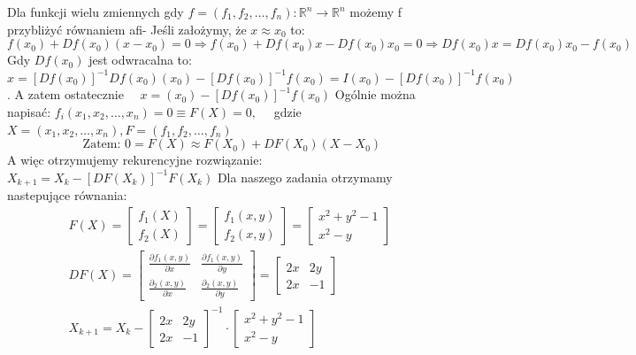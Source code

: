 \documentclass[5]{article}
\begin{document}
Dla funkcji wielu zmiennych gdy $f=\left(f_{1}, f_{2}, \ldots, f_{n}\right): \mathbb{R}^{n} \rightarrow \mathbb{R}^{n}$ możemy f przybliżyć równaniem afi-
Jeśli założymy, że $x \approx x_{0}$ to:
$$
f\left(x_{0}\right)+D f\left(x_{0}\right)\left(x-x_{0}\right)=0 \Rightarrow f\left(x_{0}\right)+D f\left(x_{0}\right) x-D f\left(x_{0}\right) x_{0}=0 \Rightarrow D f\left(x_{0}\right) x=D f\left(x_{0}\right) x_{0}-f\left(x_{0}\right)
$$
Gdy $D f\left(x_{0}\right)$ jest odwracalna to: $x=\left[D f\left(x_{0}\right)\right]^{-1} D f\left(x_{0}\right)\left(x_{0}\right)-\left[D f\left(x_{0}\right)\right]^{-1} f\left(x_{0}\right)=I\left(x_{0}\right)-\left[D f\left(x_{0}\right)\right]^{-1} f\left(x_{0}\right)$.
A zatem ostatecznie $\quad x=\left(x_{0}\right)-\left[D f\left(x_{0}\right)\right]^{-1} f\left(x_{0}\right)$
Ogólnie można napisać: $f_{i}\left(x_{1}, x_{2}, \ldots, x_{n}\right)=0 \equiv F(X)=0, \quad$ gdzie $X=\left(x_{1}, x_{2}, \ldots, x_{n}\right), F=\left(f_{1}, f_{2}, \ldots, f_{n}\right)$
$$
\text { Zatem: } 0=F(X) \approx F\left(X_{0}\right)+D F\left(X_{0}\right)\left(X-X_{0}\right)
$$
A więc otrzymujemy rekurencyjne rozwiązanie: $X_{k+1}=X_{k}-\left[D F\left(X_{k}\right)\right]^{-1} F\left(X_{k}\right)$
Dla naszego zadania otrzymamy nastepujące równania:
$$
\begin{array}{c}
F(X)=\left[\begin{array}{l}
f_{1}(X) \\
f_{2}(X)
\end{array}\right]=\left[\begin{array}{l}
f_{1}(x, y) \\
f_{2}(x, y)
\end{array}\right]=\left[\begin{array}{c}
x^{2}+y^{2}-1 \\
x^{2}-y
\end{array}\right] \\
D F(X)=\left[\begin{array}{ll}
\frac{\partial f_{1}(x, y)}{\partial x} & \frac{\partial f_{1}(x, y)}{\partial y} \\
\frac{\partial_{2}(x, y)}{\partial x} & \frac{\partial_{2}(x, y)}{\partial y}
\end{array}\right]=\left[\begin{array}{cc}
2 x & 2 y \\
2 x & -1
\end{array}\right] \\
X_{k+1}=X_{k}-\left[\begin{array}{cc}
2 x & 2 y \\
2 x & -1
\end{array}\right]^{-1} \cdot\left[\begin{array}{c}
x^{2}+y^{2}-1 \\
x^{2}-y
\end{array}\right]
\end{array}
$$
\end{document}
